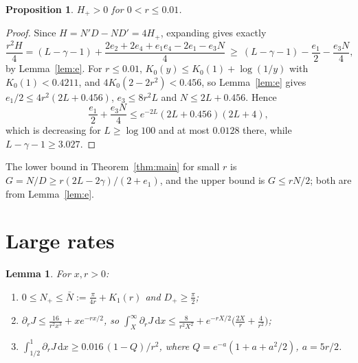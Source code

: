 \documentclass[11pt]{amsart}
\newtheorem{lemma}[theorem]{Lemma}
\newtheorem{proposition}[theorem]{Proposition}
\theoremstyle{remark}
\numberwithin{equation}{section}
\newcommand{\dd}{\,\mathrm{d}}
\begin{document}
\begin{proposition}\label{prop:small}
$H_+>0$ for $0<r\le0.01$.
\end{proposition}

\begin{proof}
Since $H=N'D-ND'=4H_+$, expanding gives exactly
\[
\frac{r^2H}4=(L-\gamma-1)+\frac{2e_2+2e_4+e_1e_4-2e_1-e_3N}4\ \ge\ (L-\gamma-1)-\frac{e_1}2-\frac{e_3N}4,
\]
by Lemma~\ref{lem:e}. For $r\le0.01$, $K_0(y)\le K_0(1)+\log(1/y)$ with $K_0(1)<0.4211$, and $4K_0(2-2r^2)<0.456$, so Lemma~\ref{lem:e} gives $e_1/2\le4r^2(2L+0.456)$, $e_3\le8r^2L$ and $N\le2L+0.456$. Hence
\[
\frac{e_1}2+\frac{e_3N}4\le e^{-2L}(2L+0.456)(2L+4),
\]
which is decreasing for $L\ge\log100$ and at most $0.0128$ there, while $L-\gamma-1\ge3.027$.
\end{proof}

The lower bound in Theorem~\ref{thm:main} for small $r$ is $G=N/D\ge r(2L-2\gamma)/(2+e_1)$, and the upper bound is $G\le rN/2$; both are from Lemma~\ref{lem:e}.

\section{Large rates}\label{sec:large}

\begin{lemma}\label{lem:large}
For $x,r>0$:
\begin{enumerate}[label=(\alph*)]
\item $0\le N_+\le\bar N:=\frac\pi{4r}+K_1(r)$ and $D_+\ge\frac\pi2$;
\item $\partial_rJ\le\frac{16}{r^2x^3}+xe^{-rx/2}$, so $\int_X^\infty\partial_rJ\dd x\le\frac8{r^2X^2}+e^{-rX/2}\bigl(\frac{2X}r+\frac4{r^2}\bigr)$;
\item $\int_{1/2}^1\partial_rJ\dd x\ge0.016\,(1-Q)/r^2$, where $Q=e^{-a}(1+a+a^2/2)$, $a=5r/2$.
\end{enumerate}
\end{lemma}
\end{document}
